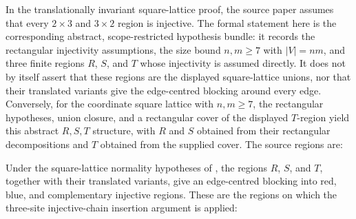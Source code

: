 \begin{definition}%
    \label{def:peps_normalSquareBlockingRegions}
    \leanok
    In the translationally invariant square-lattice proof, the source paper
    assumes that every $2\times 3$ and $3\times 2$ region is injective.
    The formal statement here is the corresponding abstract, scope-restricted
    hypothesis bundle: it records the rectangular injectivity assumptions, the
    size bound $n,m\geq 7$ with $|V|=nm$, and three finite regions
    $R$, $S$, and $T$ whose injectivity is assumed directly. It does
    not by itself assert that these regions are the displayed square-lattice
    unions, nor that their translated variants give the edge-centred blocking
    around every edge. Conversely, for the coordinate square lattice with
    $n,m\geq7$, the rectangular hypotheses, union closure, and a rectangular
    cover of the displayed $T$-region yield this abstract $R,S,T$
    structure, with $R$ and $S$ obtained from their rectangular
    decompositions and $T$ obtained from the supplied cover.
    The source regions are:
    \begin{center}
        \TNPEPSNormalRegionsRS

        \vspace{0.5em}

        \TNPEPSNormalRegionT
    \end{center}
\end{definition}

\begin{theorem}%
    \label{thm:peps_normalEdgeBlockingToInjectiveChain}
    \notready
    Under the square-lattice normality hypotheses of
    \cite[Theorem~3]{Molnar2018NormalPEPS}, the regions $R$, $S$, and
    $T$, together with their translated variants, give an edge-centred
    blocking into red, blue, and complementary injective regions. These are
    the regions on which the three-site injective-chain insertion argument is
    applied:
    \begin{center}
        \TNPEPSNormalEdgeBlockingReduction
    \end{center}
\end{theorem}

